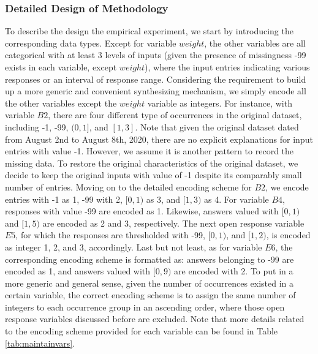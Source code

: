 \subsubsection{Detailed Design of Methodology}
\label{subsubsec:design}
To describe the design the empirical experiment, we start by introducing the corresponding data types. Except for variable $weight$, the other variables are all categorical with at least 
3 levels of inputs (given the presence of missingness -99 exists in each variable, except $weight$), where the input entries indicating various responses or an interval of response range. 
Considering the requirement to build up a more generic and convenient synthesizing mechanism, we simply encode all the other variables except the $weight$ variable as integers. For instance, 
with variable $B2$, there are four different type of occurrences in the original dataset, including -1, -99, $(0, 1]$, and $[1, 3]$. Note that given the original dataset dated from August 2nd 
to August 8th, 2020, there are no explicit explanations for input entries with value -1. However, we assume it is another pattern to record the missing data. To restore the original characteristics
of the original dataset, we decide to keep the original inputs with value of -1 despite its comparably small number of entries. Moving on to the detailed encoding scheme for $B2$, we encode 
entries with -1 as 1, -99 with 2, $[0,1)$ as 3, and $[1,3)$ as 4. For variable $B4$, responses with value -99 are encoded as 1. Likewise, answers valued with $[0, 1)$ and $[1, 5)$ are encoded as 2 
and 3, respectively. The next open response variable $E5$, for which the responses are thresholded with -99, $[0, 1)$, and $[1, 2)$, is encoded as integer 1, 2, and 3, accordingly. Last but not least, 
as for variable $E6$, the corresponding encoding scheme is formatted as: answers belonging to -99 are encoded as 1, and answers valued with $[0, 9)$ are encoded with 2. To put in a more 
generic and general sense, given the number of occurrences existed in a certain variable, the correct encoding scheme is to assign the same number of integers to each occurrence group in an 
ascending order, where those open response variables discussed before are excluded. Note that more details related to the encoding scheme provided for each variable can be found in Table \ref{tab:maintainvars}.

